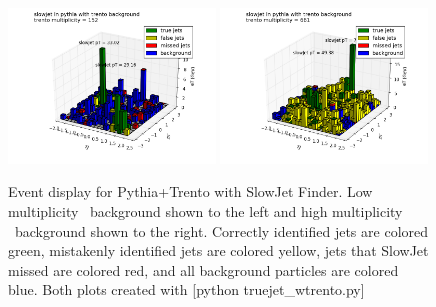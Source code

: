 \documentclass[11pt]{article}
\begin{document}
\begin{figure}[h]
\begin{center}
\includegraphics[width=0.49\textwidth]{truejet_wtrento1.png}
\includegraphics[width=0.49\textwidth]{truejet_wtrento2.png}
\label{fig_label}
\caption{Event display for Pythia+Trento with SlowJet Finder. Low multiplicity \trento\ background shown to the left and high multiplicity \trento\ background shown to the right. Correctly identified jets are colored green, mistakenly identified jets are colored yellow, jets that SlowJet missed are colored red, and all background particles are colored blue. Both plots created with [python truejet\_wtrento.py]}
\end{center}
\end{figure}
\end{document}
